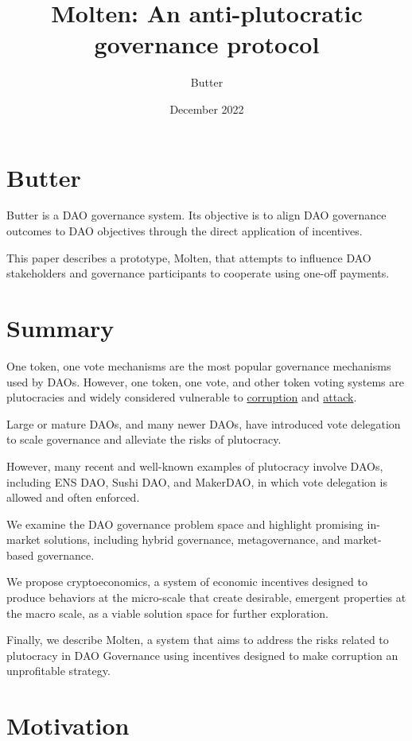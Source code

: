 \documentclass[
]{article}
\title{Molten: An anti-plutocratic governance protocol}
\author{Butter}
\date{December 2022}
\begin{document}
\maketitle
\setcounter{tocdepth}{2}
\tableofcontents

\hypertarget{butter}{%
\section{Butter}\label{butter}}

Butter is a DAO governance system. Its objective is to align DAO
governance outcomes to DAO objectives through the direct application of
incentives.

This paper describes a prototype, Molten, that attempts to influence DAO
stakeholders and governance participants to cooperate using one-off
payments.

\hypertarget{summary}{%
\section{Summary}\label{summary}}

One token, one vote mechanisms are the most popular governance
mechanisms used by DAOs. However, one token, one vote, and other token
voting systems are plutocracies and widely considered vulnerable to
\href{./problems.md\#corruption-problems}{corruption} and
\href{./problems.md\#attack-problems}{attack}.

Large or mature DAOs, and many newer DAOs, have introduced vote
delegation to scale governance and alleviate the risks of plutocracy.

However, many recent and well-known examples of plutocracy involve DAOs,
including ENS DAO, Sushi DAO, and MakerDAO, in which vote delegation is
allowed and often enforced.

We examine the DAO governance problem space and highlight promising
in-market solutions, including hybrid governance, metagovernance, and
market-based governance.

We propose cryptoeconomics, a system of economic incentives designed to
produce behaviors at the micro-scale that create desirable, emergent
properties at the macro scale, as a viable solution space for further
exploration.

Finally, we describe Molten, a system that aims to address the risks
related to plutocracy in DAO Governance using incentives designed to
make corruption an unprofitable strategy.
\hypertarget{motivation}{%
\section{Motivation}\label{motivation}}
\end{document}
